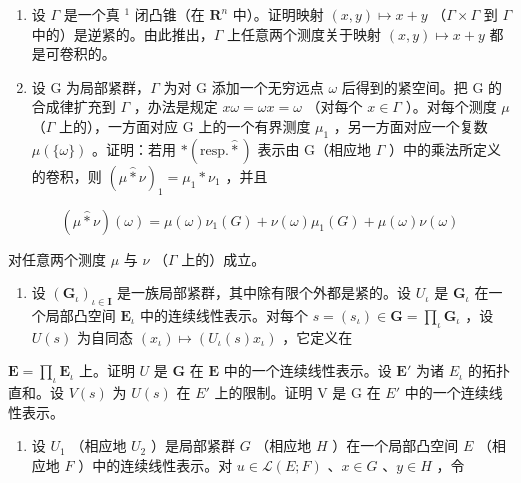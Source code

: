 
\exercisesection{}

\begin{enumerate}
\def\labelenumi{\arabic{enumi})}
\item
  设 \(\Gamma\) 是一个真 \(^{1}\) 闭凸锥（在 \(\mathbf{R}^{n}\) 中）。证明映射 \((x,y)\mapsto x+y\) （\(\Gamma\times\Gamma\) 到 \(\Gamma\) 中的）是逆紧的。由此推出，\(\Gamma\) 上任意两个测度关于映射 \((x,y)\mapsto x+y\) 都是可卷积的。
\item
  设 G 为局部紧群，\(\Gamma\) 为对 G 添加一个无穷远点 \(\omega\) 后得到的紧空间。把 G 的合成律扩充到 \(\Gamma\) ，办法是规定 \(x\omega = \omega x = \omega\) （对每个 \(x \in \Gamma\) ）。对每个测度 \(\mu\) （\(\Gamma\) 上的），一方面对应 G 上的一个有界测度 \(\mu_{1}\) ，另一方面对应一个复数 \(\mu(\{\omega\})\) 。证明：若用 \(*(\text{resp.}\widehat{*})\) 表示由 G（相应地 \(\Gamma\) ）中的乘法所定义的卷积，则 \((\mu\widehat{*}\nu)_{1} = \mu_{1}*\nu_{1}\) ，并且
\end{enumerate}

\[
(\mu \widehat {*} \nu) (\omega) = \mu (\omega) \nu_ {1} (G) + \nu (\omega) \mu_ {1} (G) + \mu (\omega) \nu (\omega)
\]

对任意两个测度 \(\mu\) 与 \(\nu\) （\(\Gamma\) 上的）成立。

\exercisesection{}

\begin{enumerate}
\def\labelenumi{\arabic{enumi})}
\tightlist
\item
  设 \((\mathbf{G}_{\iota})_{\iota \in \mathbf{I}}\) 是一族局部紧群，其中除有限个外都是紧的。设 \(U_{\iota}\) 是 \(\mathbf{G}_{\iota}\) 在一个局部凸空间 \(\mathbf{E}_{\iota}\) 中的连续线性表示。对每个 \(s = (s_{\iota}) \in \mathbf{G} = \prod_{\iota} \mathbf{G}_{\iota}\) ，设 \(U(s)\) 为自同态 \((x_{\iota}) \mapsto (U_{\iota}(s)x_{\iota})\) ，它定义在
\end{enumerate}

\(\mathbf{E} = \prod_{\iota}\mathbf{E}_{\iota}\) 上。证明 \(U\) 是 \(\mathbf{G}\) 在 \(\mathbf{E}\) 中的一个连续线性表示。设 \(\mathbf{E}'\) 为诸 \(E_{\iota}\) 的拓扑直和。设 \(V(s)\) 为 \(U(s)\) 在 \(E'\) 上的限制。证明 V 是 G 在 \(E'\) 中的一个连续线性表示。

\begin{enumerate}
\def\labelenumi{\arabic{enumi})}
\setcounter{enumi}{1}
\tightlist
\item
  设 \(U_{1}\) （相应地 \(U_{2}\) ）是局部紧群 \(G\) （相应地 \(H\) ）在一个局部凸空间 \(E\) （相应地 \(F\) ）中的连续线性表示。对 \(u \in \mathcal{L}(E; F)\) 、\(x \in G\) 、\(y \in H\) ，令
\end{enumerate}

